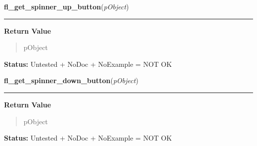     \vspace{0.5ex}

\hspace{.8\funcindent}\begin{boxedminipage}{\funcwidth}

    \raggedright \textbf{fl\_get\_spinner\_up\_button}(\textit{pObject})

    \vspace{-1.5ex}

    \rule{\textwidth}{0.5\fboxrule}
\setlength{\parskip}{2ex}
\setlength{\parskip}{1ex}
      \textbf{Return Value}
    \vspace{-1ex}

      \begin{quote}
      pObject

      \end{quote}

\textbf{Status:} Untested + NoDoc + NoExample = NOT OK



    \end{boxedminipage}

    \label{xformslib:library:fl_get_spinner_down_button}

    \vspace{0.5ex}

\hspace{.8\funcindent}\begin{boxedminipage}{\funcwidth}

    \raggedright \textbf{fl\_get\_spinner\_down\_button}(\textit{pObject})

    \vspace{-1.5ex}

    \rule{\textwidth}{0.5\fboxrule}
\setlength{\parskip}{2ex}
\setlength{\parskip}{1ex}
      \textbf{Return Value}
    \vspace{-1ex}

      \begin{quote}
      pObject

      \end{quote}

\textbf{Status:} Untested + NoDoc + NoExample = NOT OK



    \end{boxedminipage}

    \label{xformslib:library:fl_create_tabfolder}

